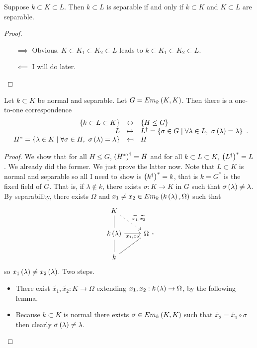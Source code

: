 \begin{lemma}
Suppose $ k \subset K \subset L $. Then $ k \subset L $ is separable if and only if $ k \subset K $ and $ K \subset L $ are separable.
\end{lemma}

\begin{proof}
\hfill
\begin{itemize}
\item[$ \implies $] Obvious. $ K \subset K_1 \subset K_2 \subset L $ leads to $ k \subset K_1 \subset K_2 \subset L $.
\item[$ \impliedby $] I will do later.
\end{itemize}
\end{proof}

\begin{theorem}
Let $ k \subset K $ be normal and separable. Let $ G = Em_k\left( K, K \right) $. Then there is a one-to-one correspondence
$$
\begin{array}{rcl}
\left\{ k \subset L \subset K \right\} & \leftrightarrow & \left\{ H \le G \right\} \\
L & \mapsto & L^\dagger = \left\{ \sigma \in G \mid \forall \lambda \in L, \ \sigma\left( \lambda \right) = \lambda \right\}\\
H^* = \left\{ \lambda \in K \mid \forall \sigma \in H, \ \sigma\left( \lambda \right) = \lambda \right\} & \mapsfrom & H
\end{array}.
$$
\end{theorem}

\begin{proof}
We show that for all $ H \le G $, $ \left( H^* \right)^\dagger = H $ and for all $ k \subset L \subset K $, $ \left( L^\dagger \right)^* = L $. We already did the former. We just prove the latter now. Note that $ L \subset K $ is normal and separable so all I need to show is $ \left( k^\dagger \right)^* = k $, that is $ k = G^* $ is the fixed field of $ G $. That is, if $ \lambda \notin k $, there exists $ \sigma : K \to K $ in $ G $ such that $ \sigma\left( \lambda \right) \ne \lambda $. By separability, there exists $ \Omega $ and $ x_1 \ne x_2 \in Em_k\left( k\left( \lambda \right), \Omega \right) $ such that
$$
\begin{tikzcd}
K \arrow[dotted]{dr}{\widetilde{x_1}, \widetilde{x_2}} & \\
k\rb{\lambda} \arrow[dash]{u} \arrow[swap]{r}{x_1, x_2} & \Omega \\
k \arrow[dash]{u} \arrow[dash]{ur} &
\end{tikzcd},
$$
so $ x_1\left( \lambda \right) \ne x_2\left( \lambda \right) $. Two steps.
\begin{itemize}
\item There exist $ \widetilde{x_1}, \widetilde{x_2} : K \to \Omega $ extending $ x_1, x_2 : k\left( \lambda \right) \to \Omega $, by the following lemma.
\item Because $ k \subset K $ is normal there exists $ \sigma \in Em_k\left( K, K \right) $ such that $ \widetilde{x_2} = \widetilde{x_1} \circ \sigma $ then clearly $ \sigma\left( \lambda \right) \ne \lambda $.
\end{itemize}
\end{proof}

